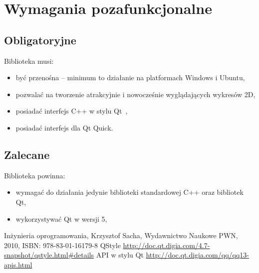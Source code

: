 \documentclass[11pt,twoside,a4paper,final]{llncs}
\begin{document}
\section{Wymagania pozafunkcjonalne}
\subsection{Obligatoryjne}
Biblioteka musi:
\begin{itemize}
\item{być przenośna -- minimum to działanie na platformach Windows i Ubuntu,}
\item{pozwalać na tworzenie atrakcyjnie i nowocześnie wyglądających wykresów 2D,}
\item{posiadać interfejs C++ w stylu Qt~\cite{qt-style-API},}
\item{posiadać interfejs dla Qt Quick.}
\end{itemize}

\subsection{Zalecane}
Biblioteka powinna:
\begin{itemize}
\item{wymagać do działania jedynie biblioteki standardowej C++ oraz bibliotek Qt,}
\item{wykorzystywać Qt w wersji 5,}

\end{itemize}


\begin{thebibliography}{}
Inżynieria oprogramowania, Krzysztof Sacha, Wydawnictwo Naukowe PWN, 2010, ISBN: 978-83-01-16179-8
QStyle \url{http://doc.qt.digia.com/4.7-snapshot/qstyle.html#details}
API w stylu Qt \url{http://doc.qt.digia.com/qq/qq13-apis.html}

\end{thebibliography}
\end{document}
